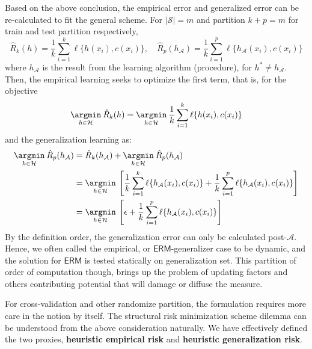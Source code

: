 Based on the above conclusion, the empirical error and generalized error can be re-calculated to fit the general scheme. For $\lvert \mathcal{S}\rvert = m$ and partition $k+p=m$ for train and test partition respectively, 
\begin{equation}
    \hat{R}_{k}(h) = \frac{1}{k} \sum^{k}_{i=1} \ell\{h(x_{i}),c(x_{i})\},\quad \hat{R}_{p}(h_{\mathcal{A}}) = \frac{1}{k} \sum^{p}_{i=1} \ell\{h_{\mathcal{A}}(x_{i}),c(x_{i})\}
\end{equation}
where $h_{\mathcal{A}}$ is the result from the learning algorithm (procedure), for $h^{*}\neq h_{\mathcal{A}}$. Then, the empirical learning seeks to optimize the first term, that is, for the objective 
\begin{equation}
    \underset{h\in \mathcal{H}}{\argmin}\: \hat{R}_{k}(h) = \underset{h\in \mathcal{H}}{\argmin}\:\frac{1}{k} \sum^{k}_{i=1} \ell\{h(x_{i}),c(x_{i})\}
\end{equation}
and the generalization learning as: 
\begin{equation}
    \begin{split}
        \underset{h\in \mathcal{H}}{\argmin}\: \hat{R}_{p}(h_{\mathcal{A}}) 
        & = \hat{R}_{k}(h_{\mathcal{A}}) + \underset{h\in \mathcal{H}}{\argmin}\:\hat{R}_{p}(h_{\mathcal{A}})\\
        & =  \underset{h\in \mathcal{H}}{\argmin}\: \left[\frac{1}{k} \sum^{k}_{i=1} \ell\{h_{\mathcal{A}}(x_{i}),c(x_{i})\} + \frac{1}{k} \sum^{p}_{i=1} \ell\{h_{\mathcal{A}}(x_{i}),c(x_{i})\}\right]\\
        & = \underset{h\in \mathcal{H}}{\argmin}\: \left[\epsilon + \frac{1}{k} \sum^{p}_{i=1} \ell\{h_{\mathcal{A}}(x_{i}),c(x_{i})\}\right]
    \end{split}
\end{equation}
By the definition order, the generalization error can only be calculated post-$\mathcal{A}$. Hence, we often called the empirical, or $\mathsf{ERM}$-generalizer case to be dynamic, and the solution for $\mathsf{ERM}$ is tested statically on generalization set. This partition of order of computation though, brings up the problem of updating factors and others contributing potential that will damage or diffuse the measure. 

For cross-validation and other randomize partition, the formulation requires more care in the notion by itself. The structural risk minimization scheme dilemma can be understood from the above consideration naturally. We have effectively defined the two proxies, \textbf{heuristic empirical risk} and \textbf{heuristic generalization risk}. 

